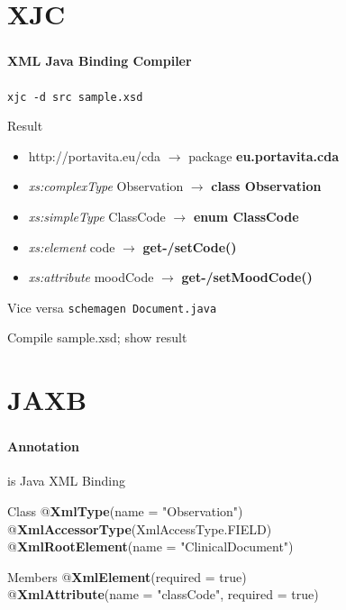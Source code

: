 \documentclass[handout]{beamer}
\begin{document}
\section{XJC}
\begin{frame}
	\frametitle{\insertsection}
	\framesubtitle{XML Java Binding Compiler}
	\begin{example}
		\texttt{xjc -d src sample.xsd}
	\end{example}
	\begin{block}{Result}
		\begin{itemize}
			\item http://portavita.eu/cda $\rightarrow$ package \textbf{eu.portavita.cda} \\
			\item \emph{xs:complexType} Observation $\rightarrow$ \textbf{class Observation} \\
			\item \emph{xs:simpleType} ClassCode $\rightarrow$ \textbf{enum ClassCode} \\
			\item \emph{xs:element} code $\rightarrow$ \textbf{get-/setCode()} \\
			\item \emph{xs:attribute} moodCode $\rightarrow$ \textbf{get-/setMoodCode()} \\
		\end{itemize}
	\end{block}
	\begin{block}{Vice versa}
		\texttt{schemagen Document.java}
	\end{block}
	\begin{semiverbatim}
		Compile sample.xsd; show result
	\end{semiverbatim}
\end{frame}

\section{JAXB}
\begin{frame}
	\frametitle{\insertsection}
	\framesubtitle{Annotation}
	\begin{block}{is}
		Java XML Binding
	\end{block}
	\begin{block}{Class}
		@\textbf{XmlType}(name = "Observation") \\
		@\textbf{XmlAccessorType}(XmlAccessType.FIELD) \\
		@\textbf{XmlRootElement}(name = "ClinicalDocument") \\
	\end{block}
	\begin{block}{Members}
		@\textbf{XmlElement}(required = true) \\
		@\textbf{XmlAttribute}(name = "classCode", required = true) \\
	\end{block}
\end{frame}
\end{document}

